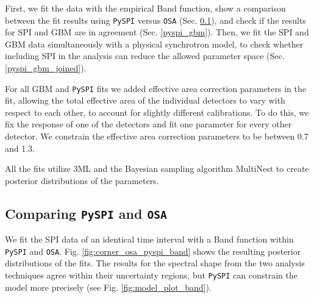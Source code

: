 \documentclass[twocolumn,traditabstract]{aa}
\begin{document}
First, we fit the data with the empirical Band function, show a comparison between the fit results using {\tt PySPI} versus {\tt OSA} (Sec. \ref{pyspi_osa}), and check if the results for SPI and GBM are in agreement (Sec. \ref{pyspi_gbm}). Then, we fit the SPI and GBM data simultaneously with a physical synchrotron model, to check whether including SPI in the analysis can reduce the allowed parameter space (Sec. \ref{pyspi_gbm_joined}).

For all GBM and {\tt PySPI} fits we added effective area correction parameters in the fit, allowing the total effective area of the individual detectors to vary with respect to each other, to account for slightly different calibrations. To do this, we fix the response of one of the detectors
and fit one parameter for every other detector. We constrain the effective area correction parameters to be between 0.7 and 1.3.

All the fits utilize 3ML \citep{3ML} and the Bayesian sampling algorithm MultiNest \citep{multinest} to create posterior distributions of the parameters.



\subsection{Comparing {\tt PySPI} and {\tt OSA}}
\label{pyspi_osa}
We fit the SPI data of an identical time interval with a Band function
within {\tt PySPI} and {\tt OSA}.
Fig. \ref{fig:corner_osa_pyspi_band} shows the resulting posterior distributions of the fits. The results for the spectral shape from the two analysis techniques agree within their uncertainty regions, but {\tt PySPI} can constrain the model more precisely (see Fig. \ref{fig:model_plot_band}).
\end{document}

